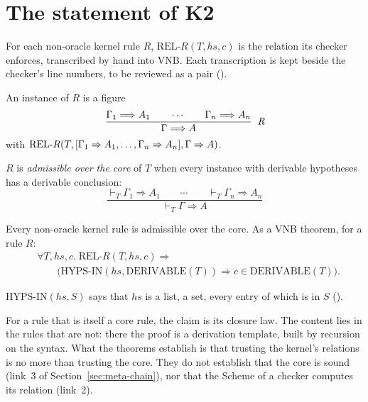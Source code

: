 \section{The statement of K2}\label{sec:meta-k2-statement}

For each non-oracle kernel rule $R$, $\mathrm{REL\text{-}}R(T,
\mathit{hs}, c)$ is the relation its checker enforces, transcribed by
hand into VNB.  Each transcription is kept beside the checker's line
numbers, to be reviewed as a pair ().

An instance of $R$ is a figure
\[
  \frac{\Gamma_1 \Longrightarrow A_1 \qquad \cdots \qquad \Gamma_n \Longrightarrow A_n}
       {\Gamma \Longrightarrow A}\;\;\mbox{\textit{R}}
\]
with $\mathrm{REL\text{-}}R(T, [\Gamma_1\Rightarrow A_1, \ldots,
\Gamma_n\Rightarrow A_n], \Gamma\Rightarrow A)$.

\begin{dfn}
$R$ is \emph{admissible over the core} of $T$ when every instance with
derivable hypotheses has a derivable conclusion:
\[
  \frac{\vdash_T \Gamma_1 \Longrightarrow A_1 \qquad \cdots \qquad \vdash_T \Gamma_n \Longrightarrow A_n}
       {\vdash_T \Gamma \Longrightarrow A}
\]
\end{dfn}

\begin{claim}\label{claim:meta-k2}
Every non-oracle kernel rule is admissible over the core.  As a VNB
theorem, for a rule $R$:
\[
\begin{aligned}
&\forall T, \mathit{hs}, c.\;
\mathrm{REL\text{-}}R(T,\mathit{hs},c) \Rightarrow{}\\
&\qquad\bigl(\mathrm{HYPS\text{-}IN}(\mathit{hs}, \mathrm{DERIVABLE}(T)) \Rightarrow
c \in \mathrm{DERIVABLE}(T)\bigr).
\end{aligned}
\]
\end{claim}

$\mathrm{HYPS\text{-}IN}(\mathit{hs}, S)$ says that $\mathit{hs}$ is a
list, a set, every entry of which is in $S$ ().

For a rule that is itself a core rule, the claim is its closure law.
The content lies in the rules that are not: there the proof is a
derivation template, built by recursion on the syntax.  What the
theorems establish is that trusting the kernel's relations is no more
than trusting the core.  They do not establish that the core is sound
(link~3 of Section~\ref{sec:meta-chain}), nor that the Scheme of a
checker computes its relation (link~2).

